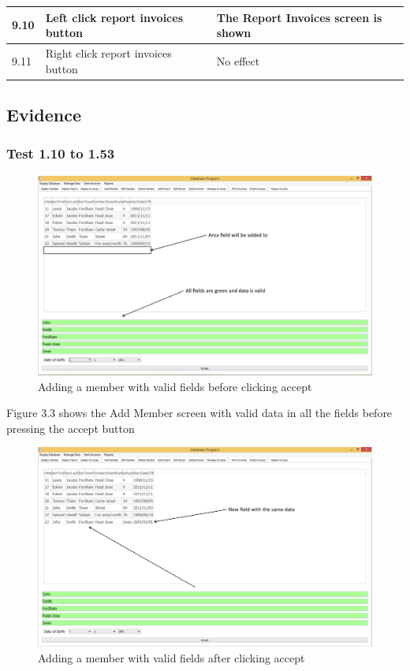 \begin{landscape}
\begin{center}
\begin{longtable}{|p{2cm}|p{5cm}|p{8cm}|}
       \rowcolor{lightgrey} 9.10 & Left click report invoices button & The Report Invoices screen is shown \\ \hline
       \rowcolor{lightgrey} 9.11 & Right click report invoices button & No effect \\ \hline
    \end{longtable}
\end{center}

\end{landscape}

\subsection{Evidence}

\subsubsection{Test 1.10 to 1.53} 
\begin{figure}[H]
\includegraphics[width=\textwidth]{./Testing/Images/AddingMember1.png}
    \caption{Adding a member with valid fields before clicking accept} \label{fig:adding_member_1}
\end{figure}

Figure 3.3 shows the Add Member screen with valid data in all the fields before pressing the accept button

\begin{figure}[H]
\includegraphics[width=\textwidth]{./Testing/Images/AddingMember2.png}
    \caption{Adding a member with valid fields after clicking accept} \label{fig:adding_member_2}
\end{figure}

